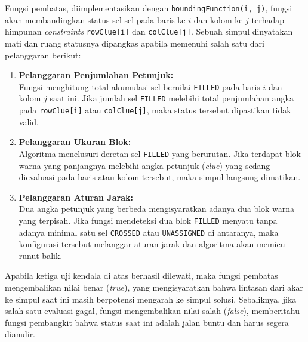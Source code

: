 \documentclass[conference]{IEEEtran}
\begin{document}
Fungsi pembatas, diimplementasikan dengan \texttt{boundingFunction(i, j)}, fungsi akan  membandingkan status sel-sel pada baris ke-$i$ dan kolom ke-$j$ terhadap himpunan \textit{constraints} \texttt{rowClue[i]} dan \texttt{colClue[j]}. Sebuah simpul dinyatakan mati dan ruang statusnya dipangkas apabila memenuhi salah satu dari pelanggaran berikut:

\begin{enumerate}
    \item \textbf{Pelanggaran Penjumlahan Petunjuk:} \\
    Fungsi menghitung total akumulasi sel bernilai \texttt{FILLED} pada baris $i$ dan kolom $j$ saat ini. Jika jumlah sel \texttt{FILLED} melebihi total penjumlahan angka pada \texttt{rowClue[i]} atau \texttt{colClue[j]}, maka status tersebut dipastikan tidak valid.
    
    \item \textbf{Pelanggaran Ukuran Blok:} \\
    Algoritma menelusuri deretan sel \texttt{FILLED} yang berurutan. Jika terdapat blok warna yang panjangnya melebihi angka petunjuk (\textit{clue}) yang sedang dievaluasi pada baris atau kolom tersebut, maka simpul langsung dimatikan.
    
    \item \textbf{Pelanggaran Aturan Jarak:} \\
    Dua angka petunjuk yang berbeda mengisyaratkan adanya dua blok warna yang terpisah. Jika fungsi mendeteksi dua blok \texttt{FILLED} menyatu tanpa adanya minimal satu sel \texttt{CROSSED} atau \texttt{UNASSIGNED} di antaranya, maka konfigurasi tersebut melanggar aturan jarak dan algoritma akan memicu runut-balik.
\end{enumerate}

Apabila ketiga uji kendala di atas berhasil dilewati, maka fungsi pembatas mengembalikan nilai benar (\textit{true}), yang mengisyaratkan bahwa lintasan dari akar ke simpul saat ini masih berpotensi mengarah ke simpul solusi. Sebaliknya, jika salah satu evaluasi gagal, fungsi mengembalikan nilai salah (\textit{false}), memberitahu fungsi pembangkit bahwa status saat ini adalah jalan buntu dan harus segera dianulir.
\end{document}

